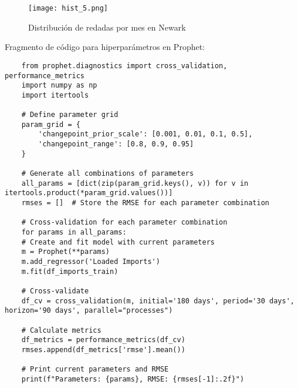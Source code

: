 \documentclass[12pt]{article}
\begin{document}
\begin{figure}[H]
 	\caption{\label{hist_5} Distribución de redadas por mes en Newark}
 	\centering
 	\hspace*{1cm}
 	\texttt{[image: hist\_5.png]}
\end{figure}

Fragmento de código para hiperparámetros en Prophet:
\begin{verbatim}
	from prophet.diagnostics import cross_validation, performance_metrics
	import numpy as np
	import itertools
	
	# Define parameter grid
	param_grid = {  
		'changepoint_prior_scale': [0.001, 0.01, 0.1, 0.5],
		'changepoint_range': [0.8, 0.9, 0.95]
	}
	
	# Generate all combinations of parameters
	all_params = [dict(zip(param_grid.keys(), v)) for v in itertools.product(*param_grid.values())]
	rmses = []  # Store the RMSE for each parameter combination
	
	# Cross-validation for each parameter combination
	for params in all_params:
	# Create and fit model with current parameters
	m = Prophet(**params)
	m.add_regressor('Loaded Imports')
	m.fit(df_imports_train)
	
	# Cross-validate
	df_cv = cross_validation(m, initial='180 days', period='30 days', horizon='90 days', parallel="processes")
	
	# Calculate metrics
	df_metrics = performance_metrics(df_cv)
	rmses.append(df_metrics['rmse'].mean())
	
	# Print current parameters and RMSE
	print(f"Parameters: {params}, RMSE: {rmses[-1]:.2f}")
	
\end{verbatim}

\newpage
\end{document}
